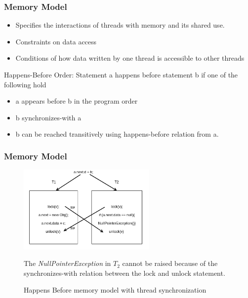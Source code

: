 \documentclass{beamer}
\begin{document}
  \begin{frame}
  \frametitle{Memory Model}
	\begin{itemize}
		\item Specifies the interactions of threads with memory and its shared use.
		\item Constraints on data access  
		\item Conditions of how data written by one thread is accessible to other threads
	\end{itemize}
	Happens-Before Order: Statement  a happens before statement b if one of the following hold
	\begin{itemize}
		\item a appears before b in the program order
		\item b synchronizes-with a
		\item b can be reached transitively using happens-before relation from a.
	\end{itemize} 

  \end{frame}
  
\begin{frame}
\frametitle{Memory Model}

\begin{figure}
	\centering
	\includegraphics[width=0.6\textwidth]{Figures/sync_threads.png}
	\caption{Happens Before memory model with thread synchronization}
	\label{fig:happensbefore1}
	
	The \emph{NullPointerException} in $T_2$ cannot be raised because of the synchronizes-with relation between the lock and unlock statement. 
	
\end{figure}

\end{frame}
\end{document}
